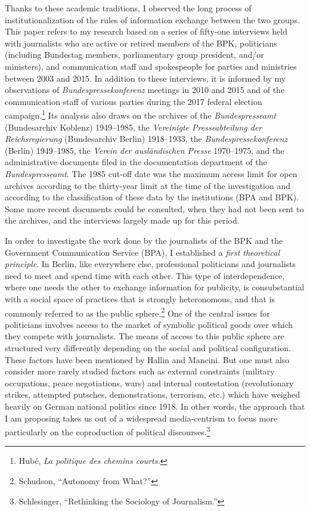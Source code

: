 \documentclass{tufte-handout}
\begin{document}
Thanks to these academic traditions, I observed the long process of
institutionalization of the rules of information exchange between the
two groups. This paper refers to my research based on a series of
fifty-one interviews held with journalists who are active or retired
members of the BPK, politicians (including Bundestag members,
parliamentary group president, and/or ministers), and communication
staff and spokespeople for parties and ministries between 2003 and 2015.
In addition to these interviews, it is informed by my observations of
\emph{Bundespressekonferenz} meetings in 2010 and 2015 and of the
communication staff of various parties during the 2017 federal election
campaign.\footnote{Hubé, \emph{La politique des chemins courts.}} Its
analysis also draws on the archives of the \emph{Bundespresseamt}
(Bundesarchiv Koblenz) 1949--1985, the \emph{Vereinigte Presseabteilung
der Reichsregierung} (Bundesarchiv Berlin) 1918--1933, the
\emph{Bundespressekonferenz} (Berlin) 1949--1985, the \emph{Verein der
ausländischen Presse} 1970--1975, and the administrative documents filed
in the documentation department of the \emph{Bundespresseamt}. The 1985
cut-off date was the maximum access limit for open archives according to
the thirty-year limit at the time of the investigation and according to
the classification of these data by the institutions (BPA and BPK). Some
more recent documents could be consulted, when they had not been sent to
the archives, and the interviews largely made up for this period.

In order to investigate the work done by the journalists of the BPK and
the Government Communication Service (BPA), I established a \emph{first
theoretical principle}. In Berlin, like everywhere else, professional
politicians and journalists need to meet and spend time with each other.
This type of interdependence, where one needs the other to exchange
information for publicity, is consubstantial with a social space of
practices that is strongly heteronomous, and that is commonly referred
to as the public sphere.\footnote{Schudson, ``Autonomy from What?''} One
of the central issues for politicians involves access to the market of
symbolic political goods over which they compete with journalists. The
means of access to this public sphere are structured very differently
depending on the social and political configuration. These factors have
been mentioned by Hallin and Mancini. But one must also consider more
rarely studied factors such as external constraints (military
occupations, peace negotiations, wars) and internal contestation
(revolutionary strikes, attempted putsches, demonstrations, terrorism,
etc.) which have weighed heavily on German national politics since 1918.
In other words, the approach that I am proposing takes us out of a
widespread media-centrism to focus more particularly on the coproduction
of political discourses.\footnote{Schlesinger, ``Rethinking the
  Sociology of Journalism.''}
\end{document}
